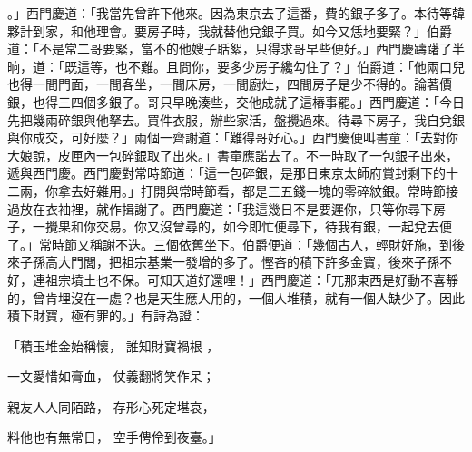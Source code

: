 。」西門慶道：「我當先曾許下他來。因為東京去了這番，費的銀子多了。本待等韓夥計到家，和他理會。要房子時，我就替他兌銀子買。如今又恁地要緊？」伯爵道：「不是常二哥要緊，當不的他嫂子聒絮，只得求哥早些便好。」西門慶躊躇了半晌，道：「既這等，也不難。且問你，要多少房子纔勾住了？」伯爵道：「他兩口兒也得一間門面，一間客坐，一間床房，一間廚灶，四間房子是少不得的。論著價銀，也得三四個多銀子。哥只早晚湊些，交他成就了這樁事罷。」西門慶道：「今日先把幾兩碎銀與他拏去。買件衣服，辦些家活，盤攪過來。待尋下房子，我自兌銀與你成交，可好麼？」兩個一齊謝道：「難得哥好心。」西門慶便叫書童：「去對你大娘說，皮匣內一包碎銀取了出來。」書童應諾去了。不一時取了一包銀子出來，遞與西門慶。西門慶對常時節道：「這一包碎銀，是那日東京太師府賞封剩下的十二兩，你拿去好雜用。」打開與常時節看，都是三五錢一塊的零碎紋銀。常時節接過放在衣袖裡，就作揖謝了。西門慶道：「我這幾日不是要遲你，只等你尋下房子，一攪果和你交易。你又沒曾尋的，如今即忙便尋下，待我有銀，一起兌去便了。」常時節又稱謝不迭。三個依舊坐下。伯爵便道：「幾個古人，輕財好施，到後來子孫高大門閭，把祖宗基業一發增的多了。慳吝的積下許多金寶，後來子孫不好，連祖宗墳土也不保。可知天道好還哩！」西門慶道：「兀那東西是好動不喜靜的，曾肯埋沒在一處？也是天生應人用的，一個人堆積，就有一個人缺少了。因此積下財寶，極有罪的。」有詩為證：

「積玉堆金始稱懷，  誰知財寶禍根 ，

一文愛惜如膏血，  仗義翻將笑作呆；

親友人人同陌路，  存形心死定堪哀，

料他也有無常日，  空手俜伶到夜臺。」

